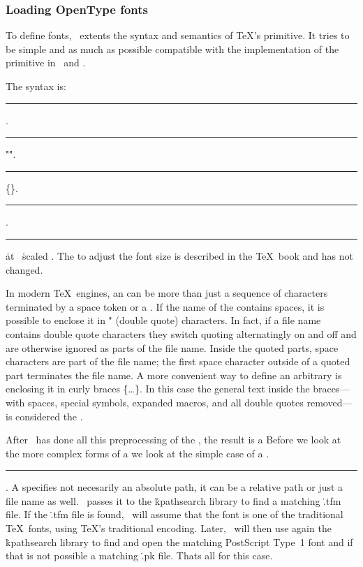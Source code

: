 \subsubsection{Loading OpenType fonts}
To define fonts, \HiTeX\ extents the syntax and semantics of \TeX's 
primitive. It tries to be simple and as much as possible compatible with
the implementation of the  primitive in \LuaTeX\ and \XeTeX.

The syntax is:
\medskip
\rule{}:  \opt{\.{=}}
   .
\rule{}: \.{"}\.{"}.
\rule{}: \.{\{}\.{\}}.
\rule{}: .
\rule{}: \.{at}  \OR\ \.{scaled} .
\medskip
The  to adjust the font size is described in the \TeX\ book
and has not changed.

In modern \TeX\ engines, an  can be more than just a sequence of characters
terminated by a space token or a .
If the name of the  contains spaces, it is possible to enclose it
in  \.{"} (double quote) characters. In fact, if a file name contains
double quote characters they switch quoting alternatingly on and off and are
otherwise ignored as parts of the file name. Inside the quoted parts, space characters
are part of the file name; the first space character outside of a quoted part
terminates the file name.
A more convenient way to define an arbitrary  is enclosing it
in curly braces \.{\{}\dots\.{\}}.
In this case the general text inside the braces---with spaces, special symbols,
expanded macros, and all double quotes removed---is considered the .

After \HiTeX\ has done all this preprocessing of the ,
the result is a  
Before we look at the more complex forms of a 
we look at the simple case of a .
\medskip
\rule{}: .
\medskip
A  specifies not necesarily an absolute path, it can be a relative path or
just a file name as well.
\HiTeX\  passes it to the \.{kpathsearch} library to find a matching \.{.tfm} file.
If the \.{.tfm} file is found, \HiTeX\ will assume that
the font is one of the traditional \TeX\ fonts, using \TeX's traditional encoding.
Later, \HiTeX\ will then use again the \.{kpathsearch} library to
find and open the matching PostScript Type~1 font and if that is not possible
a matching \.{.pk} file. Thats all for this case.

